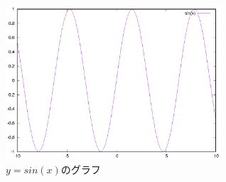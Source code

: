 \documentclass{jsarticle}
\begin{document}
\begin{figure}
  \begin{center}
    \includegraphics[width=8cm,clip]{sin.eps}
    \caption{$y = sin(x)$のグラフ}
  \end{center}
\end{figure}
\end{document}
